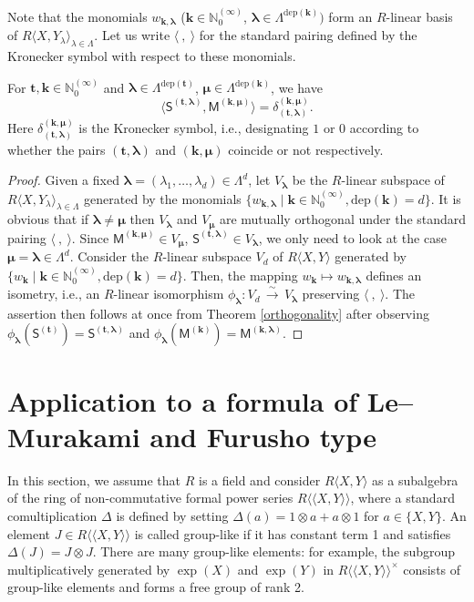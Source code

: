 \documentclass[ALCO,Unicode,published]{cedram}
\def\bk{{\mathbf{k}}}
\def\MM{{\mathsf{M}}}
\def\SS{{\mathsf{S}}}
\def\dep{\mathrm{dep}}
\def\bt{{\mathbf{t}}}
\def\lp{\langle}
\def\rp{\rangle}
\def\blambda{{\boldsymbol \lambda}}
\def\bmu{{\boldsymbol \mu}}
\def\N{{\mathbb N}}
\def\la{\langle}
\def\ra{\rangle}
\def\lala{\la\!\la}
\def\rara{\ra\!\ra}
\def\isom{\,{\overset \sim \to  }\,}
\begin{document}
Note that the monomials $w_{\bk,\blambda}$ ($\bk\in\N_0^{(\infty)}$,
$\blambda\in\Lambda^{\dep(\bk)})$
form an $R$-linear basis of $R\la X,Y_\lambda \ra_{\lambda\in \Lambda}$.
Let us write $\la\ ,\ \ra$ for the standard pairing defined by the Kronecker
symbol with respect to these monomials. 


\begin{Theorem}[Duality] \label{orthogonality2}
For $\bt, \bk\in \N_0^{(\infty)}$ and $\blambda\in\Lambda^{\dep(\bt)}$,
$\bmu\in\Lambda^{\dep(\bk)}$, we have
$$
\lp \SS^{(\bt,\blambda)},\MM^{(\bk,\bmu)}\rp=\delta_{(\bt,\blambda)}^{(\bk,\bmu)}.
$$
Here $\delta_{(\bt,\blambda)}^{(\bk,\bmu)}$ is the Kronecker symbol, 
i.e., designating $1$ or $0$
according to whether the pairs $(\bt,\blambda)$ and $(\bk,\bmu)$ 
coincide or not respectively.
\end{Theorem}

\begin{proof}
Given a fixed $\blambda=(\lambda_1,\dots,\lambda_d)\in\Lambda^d$, 
let $V_\blambda$ be the $R$-linear 
subspace of~$R\la X,Y_\lambda \ra_{\lambda\in \Lambda}$ generated by
the monomials $\{w_{\bk,\blambda}\mid\bk\in\N_0^{(\infty)}, \dep(\bk)=d\}$.
It is obvious that if $\blambda\ne\bmu$ then 
$V_\blambda$ and $V_\bmu$ are mutually orthogonal under the standard pairing $\la\ ,\ \ra$.
Since $\MM^{(\bk,\bmu)}\in V_\bmu$, $\SS^{(\bt,\blambda)}\in V_\blambda$,
we only need to look at the case $\bmu=\blambda\in \Lambda^d$. 
Consider the $R$-linear subspace $V_d$ of $R\la X,Y\ra$ generated by 
$\{w_\bk\mid \bk\in \N_0^{(\infty)}, \dep(\bk)=d\}$. Then, the mapping
$w_\bk\mapsto w_{\bk,\blambda}$ defines an isometry, i.e., an $R$-linear 
isomorphism $\phi_\blambda:V_d \isom V_\blambda$ preserving $\la\ ,\ \ra$.
The assertion then follows at once from Theorem \ref{orthogonality}
after observing $\phi_\blambda( \SS^{(\bt)})=\SS^{(\bt,\blambda)}$ and
$\phi_\blambda(\MM^{(\bk)})=\MM^{(\bk,\blambda)}$.
\end{proof}


\section{Application to a formula of Le--Murakami and Furusho type}

In this section, we assume that $R$ is a field and consider 
$R\la X,Y\ra$ as a subalgebra of the ring of non-commutative
formal power series $R\lala X,Y\rara$, where a standard
comultiplication $\Delta$ is defined by setting
$\Delta(a)=1\otimes a+a\otimes 1$ for $a\in\{X,Y\}$.  
An element $J\in R\lala X,Y\rara$ is called group-like if
it has constant term 1 and satisfies $\Delta(J)=J\otimes J$. 
There are many group-like elements: 
for example, the subgroup multiplicatively generated by $\exp(X)$ and $\exp(Y)$
in $R\lala X,Y\rara^\times$ consists of group-like elements and forms a free group of rank 2. 
\end{document}
